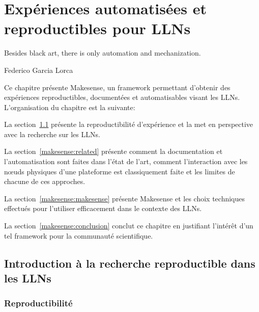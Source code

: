 
\chapter{Expériences automatisées et reproductibles pour \ac{LLN}s} 
\label{makesense}


\epigraph{Besides black art, there is only automation and mechanization.}{Federico Garcia Lorca}

\minitoc

Ce chapitre présente Makesense, un framework permettant d'obtenir des expériences reproductibles, documentées et automatisables visant les \ac{LLN}s.
L'organisation du chapitre est la suivante:

La section~\ref{makesense:reproductibility} présente la reproductibilité d'expérience et la met en perspective avec la recherche sur les \ac{LLN}s.

La section~\ref{makesense:related} présente comment la documentation et l'automatisation sont faites dans l'état de l'art, comment l'interaction avec les nœuds physiques d'une plateforme est classiquement faite et les limites de chacune de ces approches.

La section~\ref{makesense:makesense} présente Makesense et les choix techniques effectués pour l'utiliser efficacement dans le contexte des \ac{LLN}s.

La section~\ref{makesense:conclusion} conclut ce chapitre en justifiant l'intérêt d'un tel framework pour la communauté scientifique.

\section{Introduction à la recherche reproductible dans les \ac{LLN}s}
\label{makesense:reproductibility}

\subsection{Reproductibilité}

